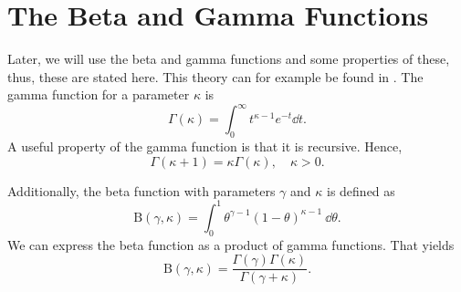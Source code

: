 \section{The Beta and Gamma Functions}


Later, we will use the beta and gamma functions and some properties of these, thus, these are stated here. This theory can for example be found in \citet{statinf}. The gamma function for a parameter $\kappa$ is 
\begin{equation*}
    \label{gamma_func}
    \Gamma(\kappa) = \int_0^\infty t^{\kappa-1}e^{-t} \dd t.
\end{equation*}
A useful property of the gamma function is that it is recursive. Hence,
\begin{equation*}
    \Gamma(\kappa+1) = \kappa \Gamma(\kappa), \quad \kappa>0 .
\end{equation*}

Additionally, the beta function with parameters $\gamma$ and $\kappa$ is defined as
\begin{equation*}
    \mathrm{B}(\gamma,\kappa) = \int_0^1 \theta^{\gamma-1}(1-\theta)^{\kappa-1} \: \dd \theta.
\end{equation*}
We can express the beta function as a product of gamma functions. That yields
\begin{equation}
    \label{beta_as_gamma}
    \mathrm{B}(\gamma,\kappa) = \frac{\Gamma(\gamma)\Gamma(\kappa)}{\Gamma(\gamma+\kappa)}.
\end{equation}









